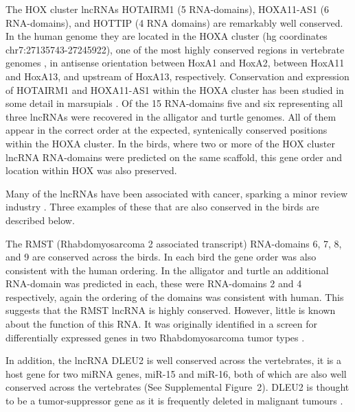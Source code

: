 \documentclass[10pt]{bmc_article}
\newenvironment{bmcformat}{\begin{raggedright}\baselineskip20pt\sloppy\setboolean{publ}{false}}{\end{raggedright}\baselineskip20pt\sloppy}
\begin{document}
\begin{bmcformat}
The HOX cluster lncRNAs HOTAIRM1 (5 RNA-domains), HOXA11-AS1 (6
RNA-domains), and HOTTIP (4 RNA domains) are remarkably well conserved. In
the human genome they are located in the HOXA cluster (hg coordinates
chr7:27135743-27245922), one of the most highly conserved regions in
vertebrate genomes \cite{PascualAnaya:13}, in antisense orientation between
HoxA1 and HoxA2, between HoxA11 and HoxA13, and upstream of HoxA13,
respectively. Conservation and expression of HOTAIRM1 and HOXA11-AS1 within
the HOXA cluster has been studied in some detail in marsupials
\cite{Yu:12}.  Of the 15 RNA-domains five and six representing all three
lncRNAs were recovered in the alligator and turtle genomes. All of them
appear in the correct order at the expected, syntenically conserved
positions within the HOXA cluster.  In the birds, where two or more of the
HOX cluster lncRNA RNA-domains were predicted on the same scaffold, this
gene order and location within HOX was also preserved.


Many of the lncRNAs have been associated with cancer, sparking a minor
review industry \cite{Prensner:2011,Spizzo:2012}. Three examples of
these that are also conserved in the birds are described below.

The RMST (Rhabdomyosarcoma 2 associated transcript) RNA-domains 6, 7,
8, and 9 are conserved across the birds. In each bird the gene order
was also consistent with the human ordering. In the alligator and
turtle an additional RNA-domain was predicted in each, these were
RNA-domains 2 and 4 respectively, again the ordering of the domains
was consistent with human. This suggests that the RMST lncRNA is
highly conserved. However, little is known about the function of this
RNA. It was originally identified in a screen for differentially
expressed genes in two Rhabdomyosarcoma tumor types \cite{Chan:2002}.

In addition, the lncRNA DLEU2 is well conserved across the
vertebrates, it is a host gene for two miRNA genes, miR-15 and miR-16,
both of which are also well conserved across the vertebrates (See
Supplemental Figure~2). DLEU2 is thought to be a tumor-suppressor gene
as it is frequently deleted in malignant tumours
\cite{Lerner:2009,Klein:2010}.


\end{bmcformat}
\end{document}
